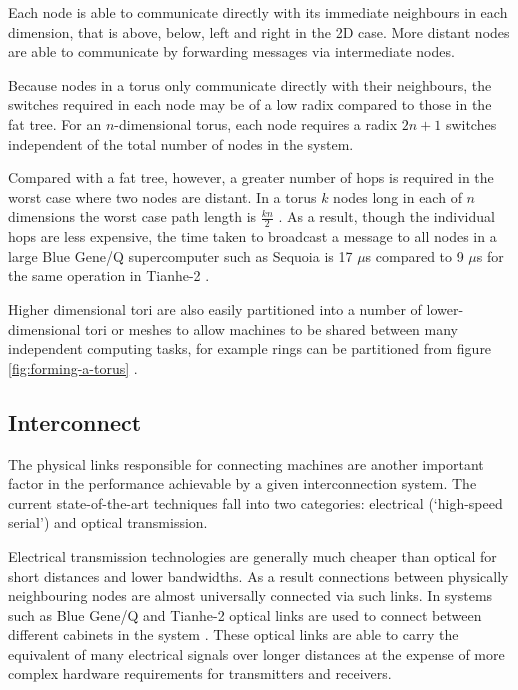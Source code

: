 				Each node is able to communicate directly with its immediate neighbours
				in each dimension, that is above, below, left and right in the 2D case.
				More distant nodes are able to communicate by forwarding messages via
				intermediate nodes.
				
				Because nodes in a torus only communicate directly with their
				neighbours, the switches required in each node may be of a low radix
				compared to those in the fat tree. For an $n$-dimensional torus, each
				node requires a radix $2n+1$ switches independent of the total number of
				nodes in the system.
				
				Compared with a fat tree, however, a greater number of hops is required
				in the worst case where two nodes are distant. In a torus $k$ nodes long
				in each of $n$ dimensions the worst case path length is $\frac{kn}{2}$
				\cite{dally04}. As a result, though the individual hops are less
				expensive, the time taken to broadcast a message to all nodes in a large
				Blue Gene/Q supercomputer such as Sequoia is 17 $\mu$s compared to 9
				$\mu$s for the same operation in Tianhe-2 \cite{morozov12}.
				
				Higher dimensional tori are also easily partitioned into a number of
				lower-dimensional tori or meshes to allow machines to be shared between
				many independent computing tasks, for example rings can be partitioned
				from figure \ref{fig:forming-a-torus} \cite{yokokawa11,chen11}.
		
		\subsection{Interconnect}
			
			
			The physical links responsible for connecting machines are another
			important factor in the performance achievable by a given interconnection
			system. The current state-of-the-art techniques fall into two categories:
			electrical (`high-speed serial') and optical transmission.
			
			Electrical transmission technologies are generally much cheaper than
			optical for short distances and lower bandwidths. As a result connections
			between physically neighbouring nodes are almost universally connected via
			such links. In systems such as Blue Gene/Q and Tianhe-2 optical links are
			used to connect between different cabinets in the system
			\cite{dongarra13,prickett10}. These optical links are able to carry the
			equivalent of many electrical signals over longer distances at the expense
			of more complex hardware requirements for transmitters and receivers.
			
